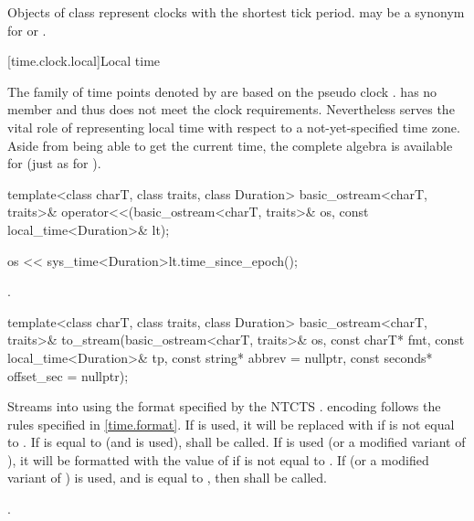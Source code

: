 \pnum
Objects of class  represent clocks with the
shortest tick period.  may be a synonym for
 or .

[time.clock.local]{Local time}
%

\pnum
The family of time points
denoted by 
are based on the pseudo clock .
 has no member 
and thus does not meet the clock requirements.
Nevertheless  serves the vital role of
representing local time with respect to a not-yet-specified time zone.
Aside from being able to get the current time,
the complete  algebra is available
for  (just as for ).

%
\begin{itemdecl}
template<class charT, class traits, class Duration>
  basic_ostream<charT, traits>&
    operator<<(basic_ostream<charT, traits>& os, const local_time<Duration>& lt);
\end{itemdecl}

\begin{itemdescr}
\pnum
\effects
\begin{codeblock}
os << sys_time<Duration>{lt.time_since_epoch()};
\end{codeblock}

\pnum
\returns {}.
\end{itemdescr}

%
\begin{itemdecl}
template<class charT, class traits, class Duration>
  basic_ostream<charT, traits>&
    to_stream(basic_ostream<charT, traits>& os, const charT* fmt, const local_time<Duration>& tp,
              const string* abbrev = nullptr, const seconds* offset_sec = nullptr);
\end{itemdecl}

\begin{itemdescr}
\pnum
\effects
Streams  into  using
the format specified by the NTCTS .
 encoding follows the rules specified in \ref{time.format}.
If  is used,
it will be replaced with  if  is not equal to .
If  is equal to  (and  is used),
 shall be called.
If  is used (or a modified variant of ),
it will be formatted with the value of 
if  is not equal to .
If  (or a modified variant of ) is used,
and  is equal to , then
 shall be called.

\pnum
\returns {}.
\end{itemdescr}

